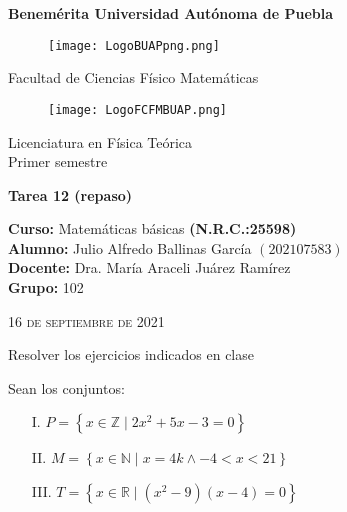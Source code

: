 \documentclass[12pt]{article}
\begin{document}
\thispagestyle{empty} 
\begin{center} \LARGE{\bf Benemérita Universidad Autónoma de Puebla} \\[0.5cm]
\begin{figure}[htb] \centering \texttt{[image: LogoBUAPpng.png]} \end{figure}
\LARGE{Facultad de Ciencias Físico Matemáticas}\\[0.5cm]
\begin{figure}[htb] \centering \texttt{[image: LogoFCFMBUAP.png]} \end{figure} 
\Large{Licenciatura en Física Teórica}\\[0.5cm]
\large{Primer semestre} \end{center}
\begin{center} { \Large \bfseries{Tarea 12 (repaso)}} \\ \end{center}
\large{\bf Curso:} Matemáticas básicas \textbf{(N.R.C.:25598)}\\
\large{\bf Alumno:} Julio Alfredo Ballinas García $\left(202107583\right)$ \\
\large{\bf Docente:} Dra. María Araceli Juárez Ramírez\\
\large{\bf Grupo:} 102\\ \begin{center} 
\vfill
\textsc{16 de septiembre de 2021} \end{center}  

\newpage
\sffamily

{\LARGE{ Resolver los ejercicios indicados en clase \\ }}

\sffamily
Sean los conjuntos: 

\begin{enumerate}
        \item [I.] $P= \left\{x \in \mathbb{Z} \mid 2x^2+5x-3=0\right\}$
\end{enumerate}

\begin{enumerate}
        \item [II.] $M= \left\{x \in \mathbb{N} \mid x=4k \wedge -4<x<21\right\}$
\end{enumerate}
\begin{enumerate}
        \item [III.]  $T= \left\{x \in \mathbb{R} \mid (x^2-9)(x-4)=0\right\}$ \\
\end{enumerate}
\end{document}
